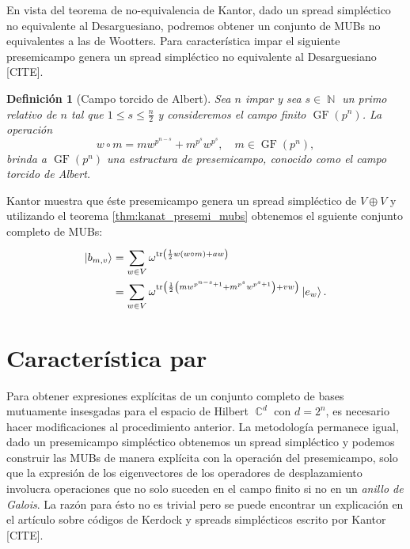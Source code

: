 \documentclass[a4paper]{report}
\DeclareMathOperator{\C}{\mathbb{C}}
\DeclareMathOperator{\N}{\mathbb{N}}
\DeclareMathOperator{\tr}{tr}
\DeclareMathOperator{\GF}{GF}
\newtheorem{definition}{Definición}
\begin{document}
  En vista del teorema de no-equivalencia de Kantor, dado un
  spread simpléctico no equivalente al Desarguesiano,
  podremos obtener un conjunto de MUBs no equivalentes a las
  de Wootters. Para característica impar el siguiente
  presemicampo genera un spread simpléctico no equivalente
  al Desarguesiano [CITE].
  \begin{definition}[Campo torcido de Albert]
    \label{def:alberts_spread}
    Sea $n$ impar y sea $s \in \N$ un primo relativo de $n$
    tal que $1 \leq s \leq \frac{n}{2}$ y consideremos el
    campo finito $\GF(p^{n})$. La operación
    \begin{equation}
      w \circ m
      = mw^{p^{n-s}} + m^{p^{s}} w^{p^{s}},
      \quad m \in \GF(p^{n}),
    \end{equation}
    brinda a $\GF(p^{n})$ una estructura de presemicampo,
    conocido como el campo torcido de Albert.
  \end{definition}
  Kantor muestra que éste presemicampo genera un spread
  simpléctico de $V \oplus V$ y utilizando el teorema
  \ref{thm:kanat_presemi_mubs} obtenemos el sguiente
  conjunto completo de MUBs:
  \begin{align}
    \ket{b_{m,v}}
    &= \sum_{w \in V}^{}
    \omega^{\tr\left(
      \frac{1}{2} w (w \circ m) + a w
    \right) } \\
    &= \sum_{w \in V}^{}
    \omega^{\tr\left(
      \frac{1}{2}
      \left(
        mw^{p^{n-s}+1} + m^{p^{s}}w^{p^{s}+1}
      \right) + v w
    \right) } \ket{e_w}.
  \end{align}
    
  \section{Característica par}

  Para obtener expresiones explícitas de un conjunto
  completo de bases mutuamente insesgadas para el espacio de
  Hilbert $\C^{d}$ con $d = 2^{n}$, es necesario hacer
  modificaciones al procedimiento anterior. La metodología
  permanece igual, dado un presemicampo simpléctico
  obtenemos un spread simpléctico y podemos construir las
  MUBs de manera explícita con la operación del
  presemicampo, solo que la expresión de los eigenvectores
  de los operadores de desplazamiento involucra operaciones
  que no solo suceden en el campo finito si no en un
  \textit{anillo de Galois}. La razón para ésto no es
  trivial pero se puede encontrar un explicación en el
  artículo sobre códigos de Kerdock y spreads simplécticos
  escrito por Kantor [CITE].
\end{document}
